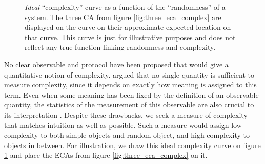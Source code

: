 \begin{figure}[htbp]
  \centering
\caption{\emph{Ideal} ``complexity'' curve as a function of the ``randomness''
  of a system. The three \ac{CA} from figure \ref{fig:three_eca_complex} are
  displayed on the curve on their approximate expected location on that curve.
  This curve is just for illustrative purposes and does not reflect any true
  function linking randomness and complexity.}
\label{fig:complexity_curve}
\end{figure}

No clear observable and protocol have been proposed that would give a
quantitative notion of complexity.
\textcite{grassbergerProblemsQuantifyingSelfgenerated1989} argued that no single
quantity is sufficient to measure complexity, since it depends on exactly how
meaning is assigned to this term. Even when some meaning has been fixed by the
definition of an observable quantity, the statistics of the measurement of this
observable are also crucial to its interpretation
\parencite{gutowitzCellularAutomataSciences1995}. Despite these drawbacks, we
seek a measure of complexity that matches intuition as well as possible. Such a
measure would assign low complexity to both simple objects and random object,
and high complexity to objects in between. For illustration, we draw this ideal
complexity curve on figure \ref{fig:complexity_curve} and place the \acp{ECA}
from figure \ref{fig:three_eca_complex} on it.


